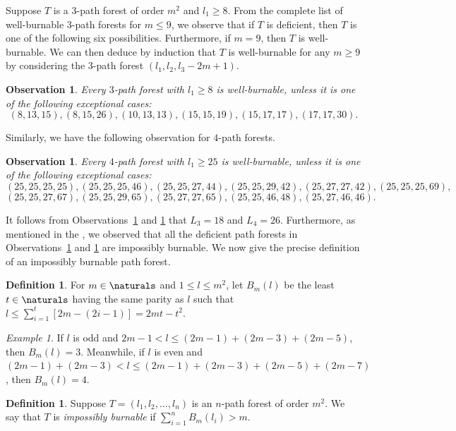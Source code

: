 \documentclass[
final
]{dmtcs-episciences}
\newtheorem{observation}[theorem]{Observation}
\theoremstyle{definition}
\newtheorem{definition}[theorem]{Definition}
\theoremstyle{remark}
\newtheorem{example}[theorem]{Example}
\begin{document}
Suppose $T$ is a $3$-path forest of order $m^2$ and $l_1\geq 8$.
From the complete list of well-burnable $3$-path forests for $m\leq 9$, we observe that if $T$ is deficient, then $T$ is one of the following six possibilities.
Furthermore, if $m=9$, then $T$ is well-burnable.
We can then deduce by induction that $T$ is well-burnable for any $m\geq 9$ by considering the $3$-path forest $(l_1,l_2,l_3-2m+1)$.

\begin{observation}\label{261021b}
	Every $3$-path forest with $l_1\geq 8$ is well-burnable, unless it is one of the following exceptional cases:
	$$(8,13,15), (8,15,26), (10,13,13), (15,15,19), (15, 17, 17), (17, 17, 30).$$
\end{observation}

Similarly, we have the following observation for $4$-path forests.

\begin{observation}\label{230222b}
	Every $4$-path forest with $l_1\geq 25$ is well-burnable, unless it is one of the following exceptional cases:
	$$(25,25,25,25), (25,25,25,46), (25,25,27,44), (25,25, 29, 42), (25,27,27,42), (25,25,25,69),$$
	$$ (25,25,27,67), (25,25, 29, 65), (25,27,27,65), (25,25,46,48), (25,27,46,46).$$	
\end{observation}

It follows from Observations~\ref{261021b} and \ref{230222b} that $L_3=18$ and $L_4=26$. Furthermore, as mentioned in the , we observed that all the deficient path forests in Observations~\ref{261021b} and \ref{230222b} are impossibly burnable.
We now give the precise definition of an impossibly burnable path forest.

\begin{definition}
	For $m\in\naturals$ and $1\le l\le m^2$, let $B_m(l)$ be the least $t\in\naturals$ having the same parity as $l$ such that $l\leq \sum_{i=1}^t [2m - (2i-1)] = 2mt-t^2$.
\end{definition}

\begin{example}
	If $l$ is odd and $ 2m-1< l \leq (2m-1)+(2m-3)+(2m-5)$, then $B_m(l)=3$.
	Meanwhile, if $l$ is even and $(2m-1)+(2m-3)< l \leq  (2m-1)+(2m-3)+(2m-5)+(2m-7)$, then $B_m(l)=4$.
\end{example}

\begin{definition}
	Suppose $T=(l_1,l_2,\ldots,l_n)$ is an $n$-path forest of order $m^2$.
	We say that $T$ is \emph{impossibly burnable} if $\sum_{i=1}^n B_m(l_i)>m$.
\end{definition}
\end{document}
